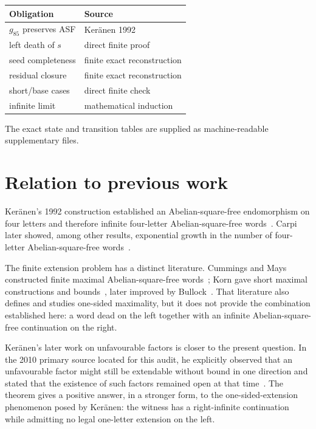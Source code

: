 \documentclass[11pt]{article}
\theoremstyle{definition}
\begin{document}
\begin{center}
\begin{tabular}{@{}p{2.35in}p{3.45in}@{}}
\toprule
\textbf{Obligation} & \textbf{Source}\\
\midrule
$g_{85}$ preserves ASF & Ker\"anen 1992\\
left death of $s$ & direct finite proof\\
seed completeness & finite exact reconstruction\\
residual closure & finite exact reconstruction\\
short/base cases & direct finite check\\
infinite limit & mathematical induction\\
\bottomrule
\end{tabular}
\end{center}

The exact state and transition tables are supplied as machine-readable supplementary files.

\section{Relation to previous work}

Ker\"anen's 1992 construction established an Abelian-square-free endomorphism on four letters and therefore infinite four-letter Abelian-square-free words~\cite{Keranen1992}. Carpi later showed, among other results, exponential growth in the number of four-letter Abelian-square-free words~\cite{Carpi1998}.

The finite extension problem has a distinct literature. Cummings and Mays constructed finite maximal Abelian-square-free words~\cite{CummingsMays2001}; Korn gave short maximal constructions and bounds~\cite{Korn2003}, later improved by Bullock~\cite{Bullock2004}. That literature also defines and studies one-sided maximality, but it does not provide the combination established here: a word dead on the left together with an infinite Abelian-square-free continuation on the right.

Ker\"anen's later work on unfavourable factors is closer to the present question. In the 2010 primary source located for this audit, he explicitly observed that an unfavourable factor might still be extendable without bound in one direction and stated that the existence of such factors remained open at that time~\cite{Keranen2010}. The theorem gives a positive answer, in a stronger form, to the one-sided-extension phenomenon posed by Ker\"anen: the witness has a right-infinite continuation while admitting no legal one-letter extension on the left.
\end{document}
